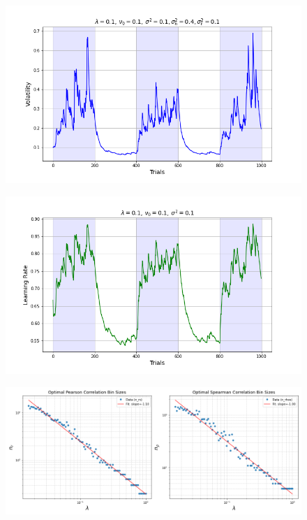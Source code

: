 \documentclass[12pt]{article}
\theoremstyle{definition}
\begin{document}
\begin{figure}[H]
    \centering
    \includegraphics[scale=0.5]{../Figures/exp2_vol.png}
\end{figure}

\begin{figure}[H]
    \centering
    \includegraphics[scale=0.5]{../Figures/exp2_lr.png}
\end{figure}

\begin{figure}[H]
    \centering
    \includegraphics[scale=0.5]{../Figures/regression2.png}
\end{figure}
\end{document}
